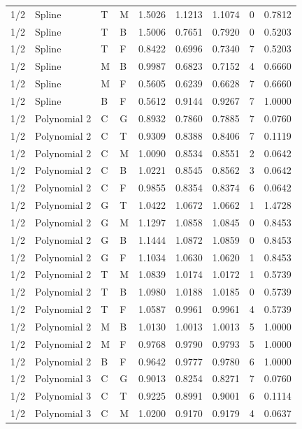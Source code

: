 \begin{longtable}{llllrrrrr}
1/2 & Spline & T & M & 1.5026 & 1.1213 & 1.1074 & 0 & 0.7812 \\
1/2 & Spline & T & B & 1.5006 & 0.7651 & 0.7920 & 0 & 0.5203 \\
1/2 & Spline & T & F & 0.8422 & 0.6996 & 0.7340 & 7 & 0.5203 \\
1/2 & Spline & M & B & 0.9987 & 0.6823 & 0.7152 & 4 & 0.6660 \\
1/2 & Spline & M & F & 0.5605 & 0.6239 & 0.6628 & 7 & 0.6660 \\
1/2 & Spline & B & F & 0.5612 & 0.9144 & 0.9267 & 7 & 1.0000 \\
1/2 & Polynomial 2 & C & G & 0.8932 & 0.7860 & 0.7885 & 7 & 0.0760 \\
1/2 & Polynomial 2 & C & T & 0.9309 & 0.8388 & 0.8406 & 7 & 0.1119 \\
1/2 & Polynomial 2 & C & M & 1.0090 & 0.8534 & 0.8551 & 2 & 0.0642 \\
1/2 & Polynomial 2 & C & B & 1.0221 & 0.8545 & 0.8562 & 3 & 0.0642 \\
1/2 & Polynomial 2 & C & F & 0.9855 & 0.8354 & 0.8374 & 6 & 0.0642 \\
1/2 & Polynomial 2 & G & T & 1.0422 & 1.0672 & 1.0662 & 1 & 1.4728 \\
1/2 & Polynomial 2 & G & M & 1.1297 & 1.0858 & 1.0845 & 0 & 0.8453 \\
1/2 & Polynomial 2 & G & B & 1.1444 & 1.0872 & 1.0859 & 0 & 0.8453 \\
1/2 & Polynomial 2 & G & F & 1.1034 & 1.0630 & 1.0620 & 1 & 0.8453 \\
1/2 & Polynomial 2 & T & M & 1.0839 & 1.0174 & 1.0172 & 1 & 0.5739 \\
1/2 & Polynomial 2 & T & B & 1.0980 & 1.0188 & 1.0185 & 0 & 0.5739 \\
1/2 & Polynomial 2 & T & F & 1.0587 & 0.9961 & 0.9961 & 4 & 0.5739 \\
1/2 & Polynomial 2 & M & B & 1.0130 & 1.0013 & 1.0013 & 5 & 1.0000 \\
1/2 & Polynomial 2 & M & F & 0.9768 & 0.9790 & 0.9793 & 5 & 1.0000 \\
1/2 & Polynomial 2 & B & F & 0.9642 & 0.9777 & 0.9780 & 6 & 1.0000 \\
1/2 & Polynomial 3 & C & G & 0.9013 & 0.8254 & 0.8271 & 7 & 0.0760 \\
1/2 & Polynomial 3 & C & T & 0.9225 & 0.8991 & 0.9001 & 6 & 0.1114 \\
1/2 & Polynomial 3 & C & M & 1.0200 & 0.9170 & 0.9179 & 4 & 0.0637 \\

\end{longtable}
